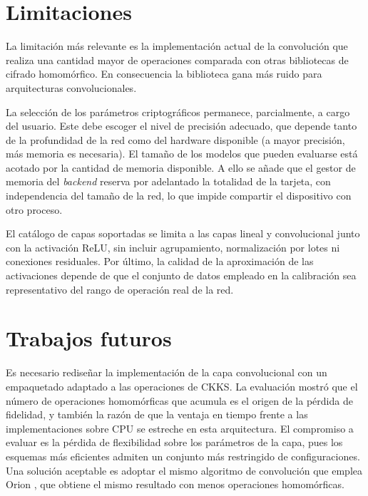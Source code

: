 \section*{Limitaciones}

La limitación más relevante es la implementación actual de la convolución que realiza una cantidad mayor de operaciones comparada con otras bibliotecas de cifrado homomórfico. En consecuencia la biblioteca gana más ruido para arquitecturas convolucionales.

La selección de los parámetros criptográficos permanece, parcialmente, a cargo del usuario. Este debe escoger el nivel de precisión adecuado, que depende tanto de la profundidad de la red como del hardware disponible (a mayor precisión, más memoria es necesaria). El tamaño de los modelos que pueden evaluarse está acotado por la cantidad de memoria disponible. A ello se añade que el gestor de memoria del \textit{backend} reserva por adelantado la totalidad de la tarjeta, con independencia del tamaño de la red, lo que impide compartir el dispositivo con otro proceso.

El catálogo de capas soportadas se limita a las capas lineal y convolucional junto con la activación ReLU, sin incluir agrupamiento, normalización por lotes ni conexiones residuales. Por último, la calidad de la aproximación de las activaciones depende de que el conjunto de datos empleado en la calibración sea representativo del rango de operación real de la red.

\section*{Trabajos futuros}

Es necesario rediseñar la implementación de la capa convolucional con un empaquetado adaptado a las operaciones de CKKS. La evaluación mostró que el número de operaciones homomórficas que acumula es el origen de la pérdida de fidelidad, y también la razón de que la ventaja en tiempo frente a las implementaciones sobre CPU se estreche en esta arquitectura. El compromiso a evaluar es la pérdida de flexibilidad sobre los parámetros de la capa, pues los esquemas más eficientes admiten un conjunto más restringido de configuraciones. Una solución aceptable es adoptar el mismo algoritmo de convolución que emplea Orion \cite{Orion}, que obtiene el mismo resultado con menos operaciones homomórficas.

